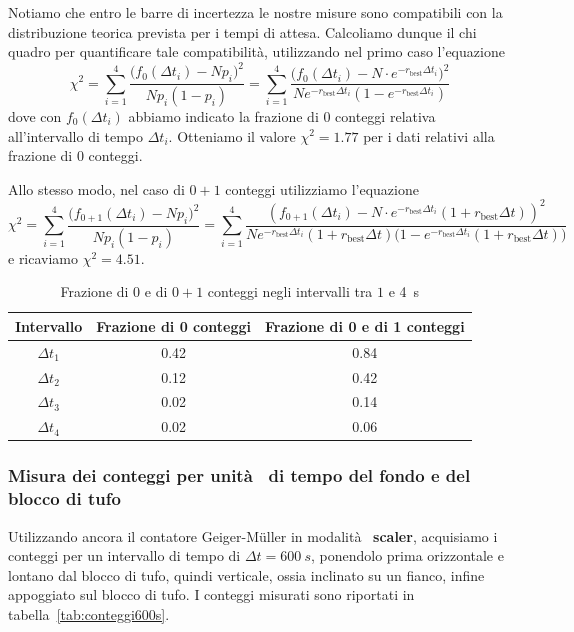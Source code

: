 \documentclass[10pt,oneside,a4paper]{article}
\begin{document}
Notiamo che entro le barre di incertezza le nostre misure sono compatibili con la distribuzione teorica prevista per i tempi di attesa. Calcoliamo dunque il chi quadro per quantificare tale compatibilità, utilizzando nel primo caso l'equazione
\[
\chi^2 = \sum_{i = 1}^4 \frac{\big(f_0(\Delta t_i) - Np_i\big)^2}{Np_i(1-p_i)} = \sum_{i = 1}^4 \frac{\big(f_0(\Delta t_i) - N\cdot e^{-r_{\text{best}}\Delta t_i}\big)^2}{Ne^{-r_{\text{best}}\Delta t_i}(1-e^{-r_{\text{best}}\Delta t_i})}
\]
dove con $f_0(\Delta t_i)$ abbiamo indicato la frazione di $0$ conteggi relativa all'intervallo di tempo $\Delta t_i$. Otteniamo il valore $\chi^2 = 1.77$ per i dati relativi alla frazione di $0$ conteggi.

Allo stesso modo, nel caso di $0+1$ conteggi utilizziamo l'equazione
\[
\chi^2 = \sum_{i = 1}^4 \frac{\big(f_{0+1}(\Delta t_i) - Np_i\big)^2}{Np_i(1-p_i)} = \sum_{i = 1}^4 \frac{\left(f_{0+1}(\Delta t_i) - N\cdot e^{-r_{\text{best}}\Delta t_i}(1+r_{\text{best}}\Delta t)\right)^2}{Ne^{-r_{\text{best}}\Delta t_i}(1+r_{\text{best}}\Delta t)\big(1-e^{-r_{\text{best}}\Delta t_i}(1+r_{\text{best}}\Delta t)\big)}
\]
e ricaviamo $\chi^2 = 4.51$.

\begin{table}[ht]
\caption{Frazione di $0$ e di $0+1$ conteggi negli intervalli tra $1$ e \SI{4}{s}}
\label{tab:0e01conteggi}
\centering
\begin{tabular}{ccc}
\toprule
Intervallo & Frazione di 0 conteggi & Frazione di 0 e di 1 conteggi \\
\hline 
$\Delta t_1$ & 0.42  & 0.84 \\ 
$\Delta t_2$ & 0.12  & 0.42 \\
$\Delta t_3$ & 0.02  & 0.14 \\
$\Delta t_4$ & 0.02  & 0.06 \\
\bottomrule
\end{tabular}
\end{table}

\subsubsection{Misura dei conteggi per unità  di tempo del fondo e del blocco di tufo}
\label{subsec:10minuti}
Utilizzando ancora il contatore Geiger-M\"uller in modalità  \textbf{scaler}, acquisiamo i conteggi per un intervallo di tempo di $\Delta t = \SI{600}{s}$, ponendolo prima orizzontale e lontano dal blocco di tufo, quindi verticale, ossia inclinato su un fianco, infine appoggiato sul blocco di tufo. I conteggi misurati sono riportati in tabella~\ref{tab:conteggi600s}.
\end{document}
